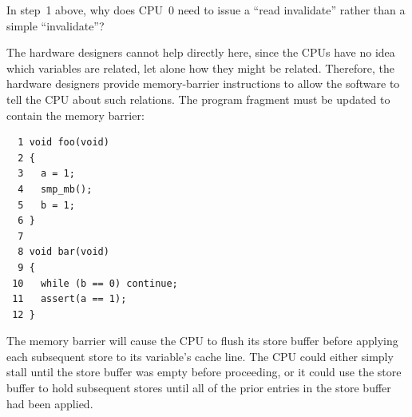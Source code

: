 \QuickQuiz{}
	In step~1 above, why does CPU~0 need to issue a ``read invalidate''
	rather than a simple ``invalidate''?
 \QuickQuizEnd

The hardware designers cannot help directly here, since the CPUs have
no idea which variables are related, let alone how they might be related.
Therefore, the hardware designers provide memory-barrier instructions
to allow the software to tell the CPU about such relations.
The program fragment must be updated to contain the memory barrier:

\vspace{5pt}
\begin{minipage}[t]{\columnwidth}
\small
\begin{verbatim}
  1 void foo(void)
  2 {
  3   a = 1;
  4   smp_mb();
  5   b = 1;
  6 }
  7
  8 void bar(void)
  9 {
 10   while (b == 0) continue;
 11   assert(a == 1);
 12 }
\end{verbatim}
\end{minipage}
\vspace{5pt}

The memory barrier  will cause the CPU to flush its store
buffer before applying each subsequent store to its variable's cache line.
The CPU could either simply stall until the store buffer was empty
before proceeding, or it could use the store buffer to hold subsequent
stores until all of the prior entries in the store buffer had been
applied.

